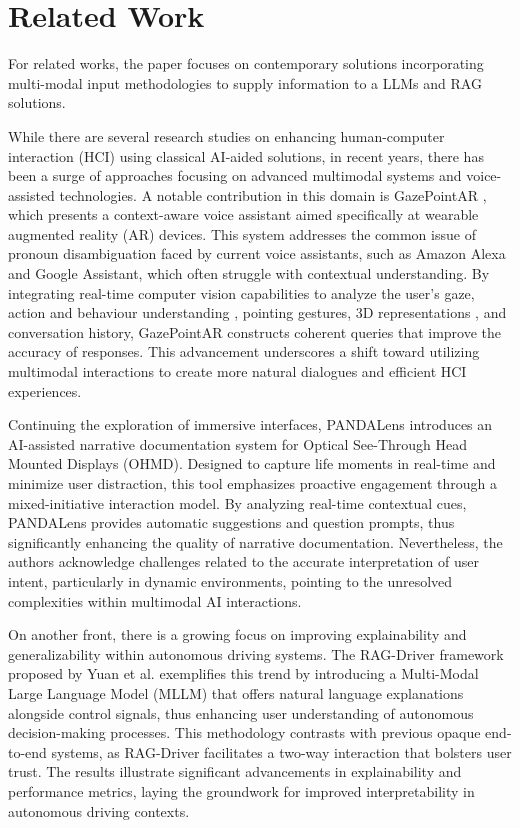 \section{Related Work}
For related works, the paper focuses on contemporary solutions incorporating multi-modal input methodologies to supply information to a LLMs and RAG solutions.

While there are several research studies on enhancing human-computer interaction (HCI) using classical AI-aided solutions\cite{10257282, 10181189}, in recent years, there has been a surge of approaches focusing on advanced multimodal systems and voice-assisted technologies. A notable contribution in this domain is GazePointAR \cite{10.1145/3613904.3642230}, which presents a context-aware voice assistant aimed specifically at wearable augmented reality (AR) devices. This system addresses the common issue of pronoun disambiguation faced by current voice assistants, such as Amazon Alexa and Google Assistant, which often struggle with contextual understanding. By integrating real-time computer vision capabilities to analyze the user's gaze, action and behaviour understanding \cite{BOUR2019289, 6977392}, pointing gestures, 3D representations \cite{4587762, ARGYRIOU20091}, and conversation history, GazePointAR constructs coherent queries that improve the accuracy of responses. This advancement underscores a shift toward utilizing multimodal interactions to create more natural dialogues and efficient HCI experiences.

Continuing the exploration of immersive interfaces, PANDALens \cite{10.1145/3613904.3642320} introduces an AI-assisted narrative documentation system for Optical See-Through Head Mounted Displays (OHMD). Designed to capture life moments in real-time and minimize user distraction, this tool emphasizes proactive engagement through a mixed-initiative interaction model. By analyzing real-time contextual cues, PANDALens provides automatic suggestions and question prompts, thus significantly enhancing the quality of narrative documentation. Nevertheless, the authors acknowledge challenges related to the accurate interpretation of user intent, particularly in dynamic environments, pointing to the unresolved complexities within multimodal AI interactions.

On another front, there is a growing focus on improving explainability and generalizability within autonomous driving systems. The RAG-Driver framework proposed by Yuan et al. \cite{yuan2024ragdrivergeneralisabledrivingexplanations} exemplifies this trend by introducing a Multi-Modal Large Language Model (MLLM) that offers natural language explanations alongside control signals, thus enhancing user understanding of autonomous decision-making processes. This methodology contrasts with previous opaque end-to-end systems, as RAG-Driver facilitates a two-way interaction that bolsters user trust. The results illustrate significant advancements in explainability and performance metrics, laying the groundwork for improved interpretability in autonomous driving contexts.

